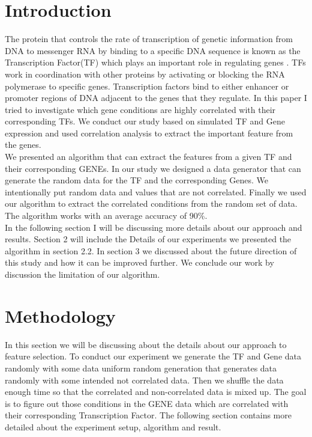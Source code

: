 \section{Introduction}
The protein that controls the rate of transcription of genetic information from DNA to messenger RNA by binding to a specific DNA sequence is known as the Transcription Factor(TF) which plays an important role in regulating genes \cite{wiki:tf123}. TFs work in coordination with other proteins by activating or blocking the RNA polymerase to specific genes. Transcription factors bind to either enhancer or promoter regions of DNA adjacent to the genes that they regulate. In this paper I tried to investigate which gene conditions are highly correlated with their corresponding TFs. We conduct our study based on simulated TF and Gene expression and used correlation analysis to extract the important feature from the genes. \\

We presented an algorithm that can extract the features from a given TF and their corresponding GENEs. In our study we designed a data generator that can generate the random data for the TF and the corresponding Genes. We intentionally put random data and values that are not correlated. Finally we used our algorithm to extract the correlated conditions from the random set of data. The algorithm works with an average accuracy of 90\%. 
\\ 

In the following section I will be discussing more details about our approach and results. Section 2 will include the Details of our experiments we presented the algorithm in section 2.2. In section 3 we discussed about the future direction of this study and how it can be improved further. We conclude our work by discussion the limitation of our algorithm. 


\section{Methodology}
In this section we will be discussing about the details about our approach to feature selection. To conduct our experiment we generate the TF and Gene data randomly with some data uniform random generation that generates data randomly with some intended not correlated data. Then we shuffle the data enough time so that the correlated and non-correlated data is mixed up. The goal is to figure out those conditions in the GENE data which are correlated with their corresponding Transcription Factor. The following section contains more detailed about the experiment setup, algorithm and result. 

